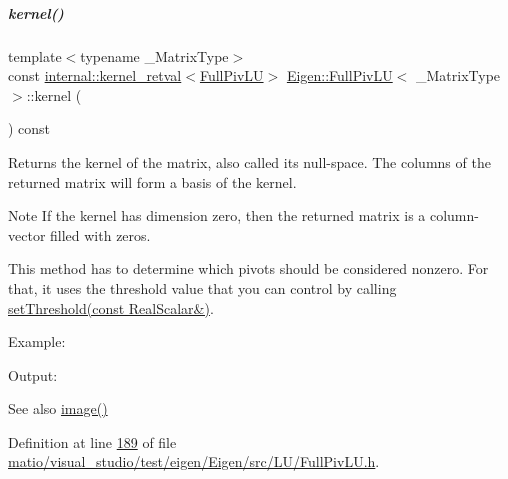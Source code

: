 \mbox{\label{group___l_u___module_a70f52eeb2cd07dfbf790fce106fb4015}} 
\subparagraph{\texorpdfstring{kernel()}{kernel()}\hspace{0.1cm}{\footnotesize\ttfamily [1/2]}}
{\footnotesize\ttfamily template$<$typename \+\_\+\+Matrix\+Type$>$ \\
const \hyperlink{struct_eigen_1_1internal_1_1kernel__retval}{internal\+::kernel\+\_\+retval}$<$\hyperlink{group___l_u___module_class_eigen_1_1_full_piv_l_u}{Full\+Piv\+LU}$>$ \hyperlink{group___l_u___module_class_eigen_1_1_full_piv_l_u}{Eigen\+::\+Full\+Piv\+LU}$<$ \+\_\+\+Matrix\+Type $>$\+::kernel (\begin{DoxyParamCaption}{ }\end{DoxyParamCaption}) const\hspace{0.3cm}{\ttfamily [inline]}}

\begin{DoxyReturn}{Returns}
the kernel of the matrix, also called its null-\/space. The columns of the returned matrix will form a basis of the kernel.
\end{DoxyReturn}
\begin{DoxyNote}{Note}
If the kernel has dimension zero, then the returned matrix is a column-\/vector filled with zeros.

This method has to determine which pivots should be considered nonzero. For that, it uses the threshold value that you can control by calling \hyperlink{group___l_u___module_a414592d82de98f5bd075965caf56d681}{set\+Threshold(const Real\+Scalar\&)}.
\end{DoxyNote}
Example\+: 
\begin{DoxyCodeInclude}
\end{DoxyCodeInclude}
 Output\+: 
\begin{DoxyVerbInclude}
\end{DoxyVerbInclude}


\begin{DoxySeeAlso}{See also}
\hyperlink{group___l_u___module_a0893985d2dab367baa6e57c6fd0c4956}{image()} 
\end{DoxySeeAlso}


Definition at line \hyperlink{matio_2visual__studio_2test_2eigen_2_eigen_2src_2_l_u_2_full_piv_l_u_8h_source_l00189}{189} of file \hyperlink{matio_2visual__studio_2test_2eigen_2_eigen_2src_2_l_u_2_full_piv_l_u_8h_source}{matio/visual\+\_\+studio/test/eigen/\+Eigen/src/\+L\+U/\+Full\+Piv\+L\+U.\+h}.

